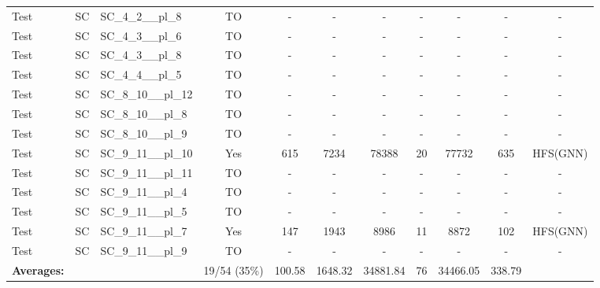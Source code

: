 \documentclass{article}
\begin{document}
\begin{tabular}{lllcccccccc}
Test & SC & SC\_4\_2\_\_pl\_8 & TO & - & - & - & - & - & - & - \\
Test & SC & SC\_4\_3\_\_pl\_6 & TO & - & - & - & - & - & - & - \\
Test & SC & SC\_4\_3\_\_pl\_8 & TO & - & - & - & - & - & - & - \\
Test & SC & SC\_4\_4\_\_pl\_5 & TO & - & - & - & - & - & - & - \\
Test & SC & SC\_8\_10\_\_pl\_12 & TO & - & - & - & - & - & - & - \\
Test & SC & SC\_8\_10\_\_pl\_8 & TO & - & - & - & - & - & - & - \\
Test & SC & SC\_8\_10\_\_pl\_9 & TO & - & - & - & - & - & - & - \\
Test & SC & SC\_9\_11\_\_pl\_10 & Yes & 615 & 7234 & 78388 & 20 & 77732 & 635 & HFS(GNN) \\
Test & SC & SC\_9\_11\_\_pl\_11 & TO & - & - & - & - & - & - & - \\
Test & SC & SC\_9\_11\_\_pl\_4 & TO & - & - & - & - & - & - & - \\
Test & SC & SC\_9\_11\_\_pl\_5 & TO & - & - & - & - & - & - & - \\
Test & SC & SC\_9\_11\_\_pl\_7 & Yes & 147 & 1943 & 8986 & 11 & 8872 & 102 & HFS(GNN) \\
Test & SC & SC\_9\_11\_\_pl\_9 & TO & - & - & - & - & - & - & - \\
\textbf{Averages:} & & & 19/54 (35\%) & 100.58 & 1648.32 & 34881.84 & 76 & 34466.05 & 338.79 & \\
\bottomrule
\end{tabular}
\newpage
\end{document}
